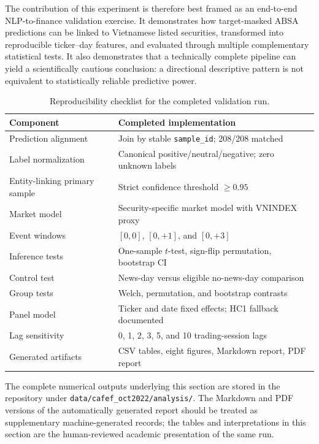 The contribution of this experiment is therefore best framed as an end-to-end NLP-to-finance validation exercise. It demonstrates how target-masked ABSA predictions can be linked to Vietnamese listed securities, transformed into reproducible ticker--day features, and evaluated through multiple complementary statistical tests. It also demonstrates that a technically complete pipeline can yield a scientifically cautious conclusion: a directional descriptive pattern is not equivalent to statistically reliable predictive power.

\begin{table}[htbp]
\centering
\caption{Reproducibility checklist for the completed validation run.}
\label{tab:reproducibility}
\begin{tabular}{p{}p{}}
\toprule
\textbf{Component} & \textbf{Completed implementation} \\
\midrule
Prediction alignment & Join by stable \texttt{sample\_id}; 208/208 matched \\
Label normalization & Canonical positive/neutral/negative; zero unknown labels \\
Entity-linking primary sample & Strict confidence threshold $\geq 0.95$ \\
Market model & Security-specific market model with VNINDEX proxy \\
Event windows & $[0,0]$, $[0,+1]$, and $[0,+3]$ \\
Inference tests & One-sample $t$-test, sign-flip permutation, bootstrap CI \\
Control test & News-day versus eligible no-news-day comparison \\
Group tests & Welch, permutation, and bootstrap contrasts \\
Panel model & Ticker and date fixed effects; HC1 fallback documented \\
Lag sensitivity & 0, 1, 2, 3, 5, and 10 trading-session lags \\
Generated artifacts & CSV tables, eight figures, Markdown report, PDF report \\
\bottomrule
\end{tabular}
\end{table}

The complete numerical outputs underlying this section are stored in the repository under \texttt{data/cafef\_oct2022/analysis/}. The Markdown and PDF versions of the automatically generated report should be treated as supplementary machine-generated records; the tables and interpretations in this section are the human-reviewed academic presentation of the same run.
